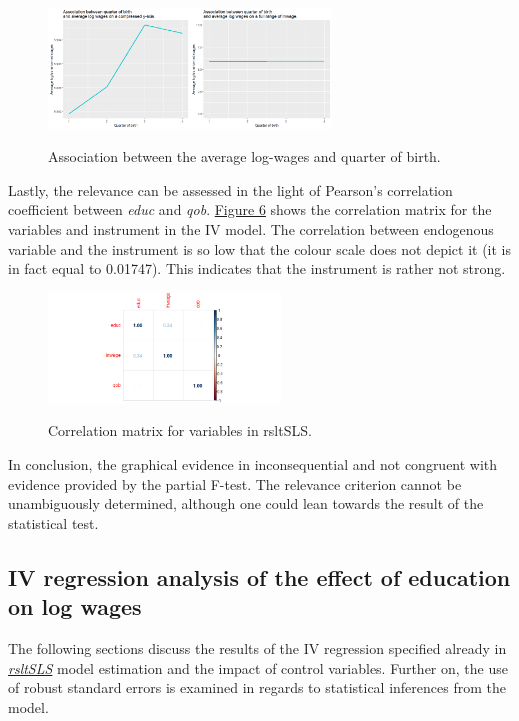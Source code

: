 \documentclass{article}
\begin{document}
\begin{figure}[!htbp]
    \caption{Association between the average log-wages and quarter of birth.}
    \centering
    \includegraphics[width=0.67\textwidth]{scatterQobLnwage.png}
    \label{fig:qobwage}
\end{figure}

Lastly, the relevance can be assessed in the light of Pearson's correlation coefficient between \textit{educ} and \textit{qob}. \hyperref[fig:corrplot]{Figure 6} shows the correlation matrix for the variables and instrument in the IV model. The correlation between endogenous variable and the instrument is so low that the colour scale does not depict it (it is in fact equal to 0.01747). This indicates that the instrument is rather not strong. 

\begin{figure}[!htbp]
    \caption{Correlation matrix for variables in rsltSLS.}
    \centering
    \includegraphics[width=0.55\textwidth]{corrplot.png}
    \label{fig:corrplot}
\end{figure}

In conclusion, the graphical evidence in inconsequential and not congruent with evidence provided by the partial F-test. The relevance criterion cannot be unambiguously determined, although one could lean towards the result of the statistical test. 

\subsection{IV regression analysis of the effect of education on log wages}

The following sections discuss the results of the IV regression specified already in \hyperref[partialftest]{\textit{rsltSLS}} model estimation and the impact of control variables. Further on, the use of robust standard errors is examined in regards to statistical inferences from the model.
\end{document}
